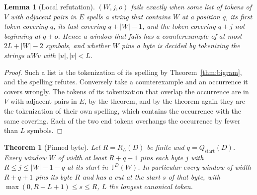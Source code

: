 \documentclass[11pt,a4paper]{article}
\theoremstyle{definition}
\theoremstyle{plain}
\newtheorem{lemma}{Lemma}
\newtheorem{theorem}{Theorem}
\newcommand{\T}{\mathbb{T}}
\newcommand{\ripple}{R_{L}}
\begin{document}
\begin{lemma}[Local refutation]\label{lem:localref}
\((W, j, o)\) fails exactly when some list of tokens of \(V\) with adjacent pairs in \(E\) spells a string that contains
\(W\) at a position \(q\), its first token covering \(q\), its last covering \(q + |W| - 1\), and the token covering
\(q + j\) not beginning at \(q + o\). Hence a window that fails has a counterexample of at most \(2L + |W| - 2\)
symbols, and whether \(W\) pins a byte is decided by tokenizing the strings \(uWv\) with \(|u|, |v| < L\).
\end{lemma}

\begin{proof}
Such a list is the tokenization of its spelling by Theorem~\ref{thm:bigram}, and the spelling refutes. Conversely take a
counterexample and an occurrence it covers wrongly. The tokens of its tokenization that overlap the occurrence are in
\(V\) with adjacent pairs in \(E\), by the theorem, and by the theorem again they are the tokenization of their own
spelling, which contains the occurrence with the same covering. Each of the two end tokens overhangs the occurrence by
fewer than \(L\) symbols.
\end{proof}


\begin{theorem}[Pinned byte]\label{thm:pinned}
Let \(R = \ripple(D)\) be finite and \(q = Q_{\mathrm{start}}(D)\). Every window \(W\) of width at least \(R + q + 1\)
pins each byte \(j\) with \(R \le j \le |W| - 1 - q\) at its start in \(\T^D(W)\). In particular every window of width
\(R + q + 1\) pins its byte \(R\) and has a cut at the start \(s\) of that byte, with
\(\max(0, R - L + 1) \le s \le R\), \(L\) the longest canonical token.
\end{theorem}
\end{document}
